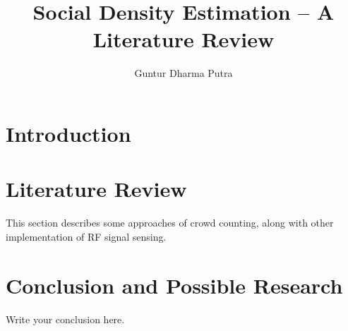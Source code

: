 \documentclass{article}
\begin{document}
\title{Social Density Estimation -- A Literature Review}
\author{Guntur Dharma Putra}

\maketitle



\section{Introduction} %
\label{sec:introduction}



\section{Literature Review} %
\label{sec:literature_review}
This section describes some approaches of crowd counting, along with other implementation of RF signal sensing.





\section{Conclusion and Possible Research}
Write your conclusion here.

{}

\end{document}
